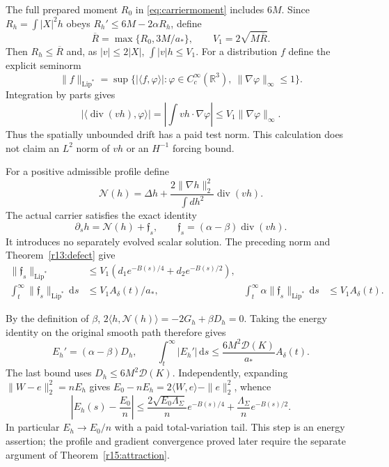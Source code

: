 \documentclass[11pt]{article}
\numberwithin{equation}{section}
\newcommand{\dd}{\,\mathrm d}
\newcommand{\R}{\mathbb R}
\begin{document}
The full prepared moment $R_0$ in \eqref{eq:carriermoment} includes
$6M$. Since $R_h=\int|X|^2h$ obeys
$R_h'\le6M-2\alpha R_h$, define
\begin{equation}\label{r13:forcingmoment}
 \overline R=\max\{R_0,3M/a_*\},\qquad
 V_1=2\sqrt{M\overline R}.
\end{equation}
Then $R_h\le\overline R$ and, as $|v|\le2|X|$,
$\int|v|h\le V_1$. For a distribution $f$ define the explicit seminorm
\[
 \|f\|_{\mathrm{Lip}^*}
 =\sup\{|\langle f,\varphi\rangle|:
       \varphi\in C_c^\infty(\R^3),\ \|\nabla\varphi\|_\infty\le1\}.
\]
Integration by parts gives
\[
 |\langle\operatorname{div}(vh),\varphi\rangle|
   =\left|\int vh\cdot\nabla\varphi\right|
       \le V_1\|\nabla\varphi\|_\infty.
\]
Thus the spatially unbounded drift has a paid test norm. This calculation
does not claim an $L^2$ norm of $vh$ or an $H^{-1}$ forcing bound.

For a positive admissible profile define
\[
 \mathcal N(h)=\Delta h+\frac{2\|\nabla h\|_2^2}{\int dh^2}
                                        \operatorname{div}(vh).
\]
The actual carrier satisfies the exact identity
\begin{equation}\label{r13:forcedscalaridentity}
 \partial_sh=\mathcal N(h)+\mathfrak f_s,\qquad
 \mathfrak f_s=(\alpha-\beta)\operatorname{div}(vh).
\end{equation}
It introduces no separately evolved scalar solution. The preceding
norm and Theorem~\ref{r13:defect} give
\begin{align}
 \|\mathfrak f_s\|_{\mathrm{Lip}^*}
  &\le V_1(d_1e^{-B(s)/4}+d_2e^{-B(s)/2}),\nonumber\\
 \int_t^\infty\|\mathfrak f_s\|_{\mathrm{Lip}^*}\dd s
  &\le V_1A_\delta(t)/a_*,&
 \int_t^\infty\alpha\|\mathfrak f_s\|_{\mathrm{Lip}^*}\dd s
  &\le V_1A_\delta(t).
 \label{r13:forcingtails}
\end{align}

By the definition of $\beta$,
$2\langle h,\mathcal N(h)\rangle=-2G_h+\beta D_h=0$.
Taking the energy identity on the original smooth path therefore gives
\begin{equation}\label{r13:scalarenergyderivative}
 E_h'=(\alpha-\beta)D_h,
 \qquad
 \int_t^\infty|E_h'|\dd s
        \le\frac{6M^2\mathcal D(K)}{a_*}A_\delta(t).
\end{equation}
The last bound uses $D_h\le6M^2\mathcal D(K)$. Independently, expanding
$\|W-e\|_2^2=nE_h$ gives
$E_0-nE_h=2\langle W,e\rangle-\|e\|_2^2$, whence
\begin{equation}\label{r13:scalarenergylimit}
 \left|E_h(s)-\frac{E_0}{n}\right|
 \le\frac{2\sqrt{E_0\Lambda_\Sigma}}{n}e^{-B(s)/4}
           +\frac{\Lambda_\Sigma}{n}e^{-B(s)/2}.
\end{equation}
In particular $E_h\to E_0/n$ with a paid total-variation tail.
This step is an energy assertion; the profile and gradient convergence
proved later require the separate argument of
Theorem~\ref{r15:attraction}.
\end{document}
